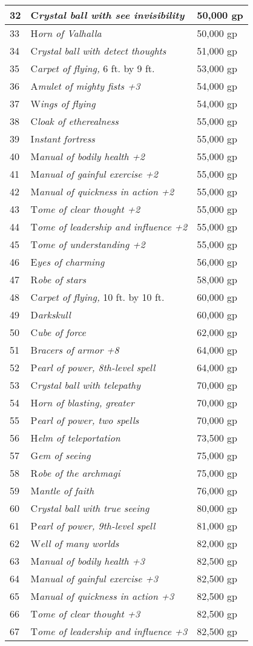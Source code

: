 \documentclass{article}
\begin{document}
\begin{tabular}{|>{\raggedright}p{14pt}|>{\raggedright}p{185pt}|>{\raggedright}p{55pt}|}
\hline
32 & C\textit{rystal ball with see invisibility} & 50,000 gp\tabularnewline
\hline
33 & H\textit{orn of Valhalla} & 50,000 gp\tabularnewline
\hline
34 & C\textit{rystal ball with detect thoughts} & 51,000 gp\tabularnewline
\hline
35 & C\textit{arpet of flying, }6 ft. by 9 ft. & 53,000 gp\tabularnewline
\hline
36 & A\textit{mulet of mighty fists +3} & 54,000 gp\tabularnewline
\hline
37 & W\textit{ings of flying} & 54,000 gp\tabularnewline
\hline
38 & C\textit{loak of etherealness} & 55,000 gp\tabularnewline
\hline
39 & I\textit{nstant fortress} & 55,000 gp\tabularnewline
\hline
40 & M\textit{anual of bodily health +2} & 55,000 gp\tabularnewline
\hline
41 & M\textit{anual of gainful exercise +2} & 55,000 gp\tabularnewline
\hline
42 & M\textit{anual of quickness in action +2} & 55,000 gp\tabularnewline
\hline
43 & T\textit{ome of clear thought +2} & 55,000 gp\tabularnewline
\hline
44 & T\textit{ome of leadership and influence +2} & 55,000 gp\tabularnewline
\hline
45 & T\textit{ome of understanding +2} & 55,000 gp\tabularnewline
\hline
46 & E\textit{yes of charming} & 56,000 gp\tabularnewline
\hline
47 & R\textit{obe of stars} & 58,000 gp\tabularnewline
\hline
48 & C\textit{arpet of flying, }10 ft. by 10 ft. & 60,000 gp\tabularnewline
\hline
49 & D\textit{arkskull} & 60,000 gp\tabularnewline
\hline
50 & C\textit{ube of force} & 62,000 gp\tabularnewline
\hline
51 & B\textit{racers of armor +8} & 64,000 gp\tabularnewline
\hline
52 & P\textit{earl of power, 8th-level spell} & 64,000 gp\tabularnewline
\hline
53 & C\textit{rystal ball with telepathy} & 70,000 gp\tabularnewline
\hline
54 & H\textit{orn of blasting, greater} & 70,000 gp\tabularnewline
\hline
55 & P\textit{earl of power, two spells} & 70,000 gp\tabularnewline
\hline
56 & H\textit{elm of teleportation} & 73,500 gp\tabularnewline
\hline
57 & G\textit{em of seeing} & 75,000 gp\tabularnewline
\hline
58 & R\textit{obe of the archmagi} & 75,000 gp\tabularnewline
\hline
59 & M\textit{antle of faith} & 76,000 gp\tabularnewline
\hline
60 & C\textit{rystal ball with true seeing} & 80,000 gp\tabularnewline
\hline
61 & P\textit{earl of power, 9th-level spell} & 81,000 gp\tabularnewline
\hline
62 & W\textit{ell of many worlds} & 82,000 gp\tabularnewline
\hline
63 & M\textit{anual of bodily health +3} & 82,500 gp\tabularnewline
\hline
64 & M\textit{anual of gainful exercise +3} & 82,500 gp\tabularnewline
\hline
65 & M\textit{anual of quickness in action +3} & 82,500 gp\tabularnewline
\hline
66 & T\textit{ome of clear thought +3} & 82,500 gp\tabularnewline
\hline
67 & T\textit{ome of leadership and influence +3} & 82,500 gp\tabularnewline

\end{tabular}
\end{document}
